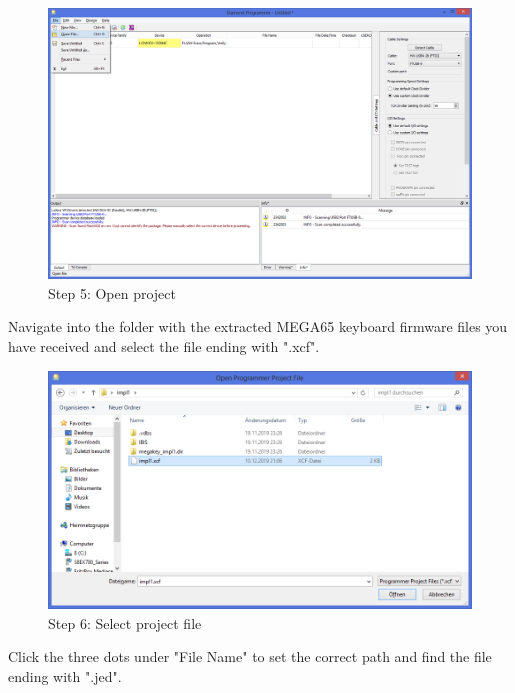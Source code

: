 \begin{figure}
  \includegraphics[width=\linewidth]{images/diamond05.png}
  \caption{Step 5: Open project}
  \label{fig:diamond05}
\end{figure}

Navigate into the folder with the extracted MEGA65 keyboard firmware files you have received and select the file ending with ".xcf".

\begin{figure}
  \includegraphics[width=\linewidth]{images/diamond06.png}
  \caption{Step 6: Select project file}
  \label{fig:diamond06}
\end{figure}

Click the three dots under "File Name" to set the correct path and find the file ending with ".jed".

